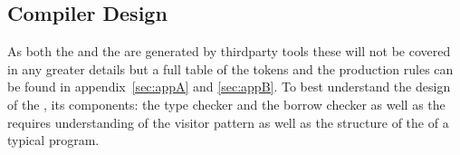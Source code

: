 \subsection{Compiler Design}
\label{sec:CompilerDesign}

As both the \lexer{} and the \parser{} are generated by thirdparty tools these will
not be covered in any greater details but a full table of the tokens and the
production rules can be found in appendix~\ref{sec:appA} and \ref{sec:appB}. To best
understand the design of the \static, its components: the type checker and the borrow
checker as well as the \codeGen{} requires understanding of
the visitor pattern as well as the structure of the \ast{} of a typical \lang{}
program.








